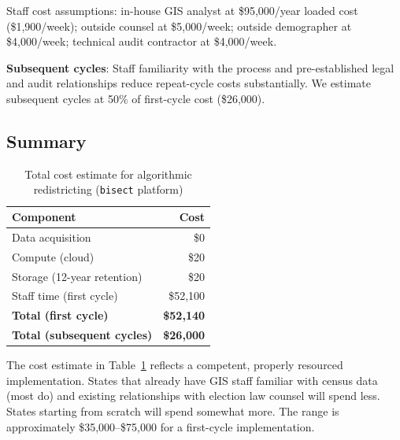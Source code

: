 Staff cost assumptions: in-house GIS analyst at \$95,000/year loaded cost (\$1,900/week); outside counsel at \$5,000/week; outside demographer at \$4,000/week; technical audit contractor at \$4,000/week.

\textbf{Subsequent cycles}: Staff familiarity with the process and pre-established legal and audit relationships reduce repeat-cycle costs substantially. We estimate subsequent cycles at 50\% of first-cycle cost (\$26,000).

\subsection{Summary}

\begin{table}[h]
\centering
\caption{Total cost estimate for algorithmic redistricting (\texttt{bisect} platform)}
\label{tab:total-cost}
\begin{tabular}{@{}lr@{}}
\toprule
Component & Cost \\
\midrule
Data acquisition & \$0 \\
Compute (cloud) & \$20 \\
Storage (12-year retention) & \$20 \\
Staff time (first cycle) & \$52,100 \\
\midrule
\textbf{Total (first cycle)} & \textbf{\$52,140} \\
\textbf{Total (subsequent cycles)} & \textbf{\$26,000} \\
\bottomrule
\end{tabular}
\end{table}

The cost estimate in Table~\ref{tab:total-cost} reflects a competent, properly resourced implementation. States that already have GIS staff familiar with census data (most do) and existing relationships with election law counsel will spend less. States starting from scratch will spend somewhat more. The range is approximately \$35,000--\$75,000 for a first-cycle implementation.
